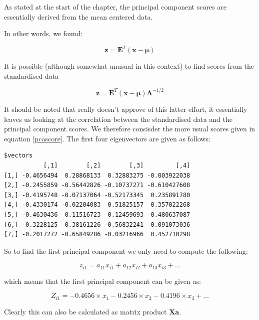 As stated at the start of the chapter, the principal component scores are essentially derived from the mean centered data.   

In other words, we found:

\begin{equation}
\label{pcascore}
\boldsymbol{z} =  \boldsymbol{E}^{T}(\boldsymbol{x}-\boldsymbol{\mu})
\end{equation}

It is possible (although somewhat unusual in this context) to find scores from the standardised data

\begin{equation}
\boldsymbol{z} =  \boldsymbol{E}^{T}(\boldsymbol{x}-\boldsymbol{\mu})  \boldsymbol{\Lambda}^{-1/2}
\end{equation}

It should be noted that \cite{Rencher:2002} really doesn't approve of this latter effort, it essentially leaves us looking at the correlation between the standardised data and the principal component scores.   We therefore consisder the more usual scores given in equation \ref{pcascore}.   The first four eigenvectors are given as follows:

\singlespacing
\begin{verbatim}
$vectors
           [,1]        [,2]        [,3]         [,4]
[1,] -0.4656494  0.28868133  0.32883275 -0.003922038  
[2,] -0.2455859 -0.56442826 -0.10737271 -0.610427608  
[3,] -0.4195748 -0.07137064 -0.52173345  0.235891780 
[4,] -0.4330174 -0.02204083  0.51825157  0.357022268 
[5,] -0.4630436  0.11516723  0.12459693 -0.480637087 
[6,] -0.3228125  0.38161226 -0.56832241  0.091073036 
[7,] -0.2017272 -0.65849286 -0.03216966  0.452710298 
\end{verbatim}
\onehalfspacing

So to find the first principal component we only need to compute the following:

\begin{displaymath}
z_{i1} = a_{11} x_{i1} + a_{12} x_{i2} + a_{13} x_{i3} + \ldots
\end{displaymath}

which means that the first principal component can be given as:

\begin{displaymath}
Z_{i1} = -0.4656 \times x_{1} - 0.2456 \times x_{2} - 0.4196 \times x_{3} + \ldots
\end{displaymath}

Clearly this can also be calculated as matrix product $\boldsymbol{X}\boldsymbol{a}$.

